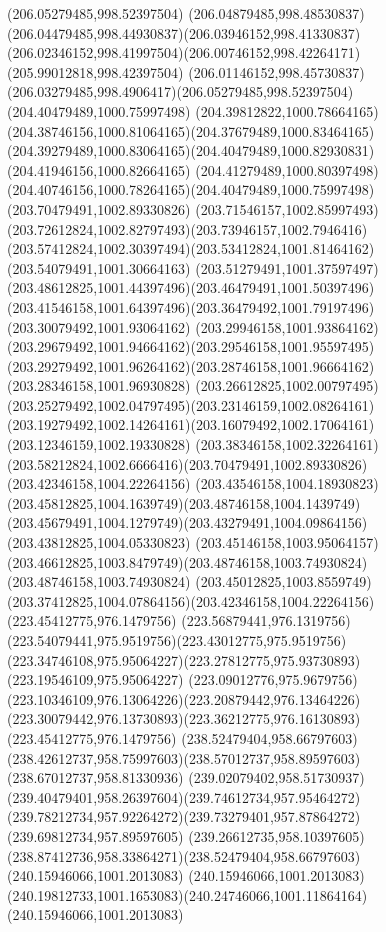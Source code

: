 {{	\moveto(206.05279485,998.52397504)
	\curveto(206.04879485,998.48530837)(206.04479485,998.44930837)(206.03946152,998.41330837)
	\curveto(206.02346152,998.41997504)(206.00746152,998.42264171)(205.99012818,998.42397504)
	\curveto(206.01146152,998.45730837)(206.03279485,998.4906417)(206.05279485,998.52397504)
	\moveto(204.40479489,1000.75997498)
	\curveto(204.39812822,1000.78664165)(204.38746156,1000.81064165)(204.37679489,1000.83464165)
	\curveto(204.39279489,1000.83064165)(204.40479489,1000.82930831)(204.41946156,1000.82664165)
	\curveto(204.41279489,1000.80397498)(204.40746156,1000.78264165)(204.40479489,1000.75997498)
	\moveto(203.70479491,1002.89330826)
	\curveto(203.71546157,1002.85997493)(203.72612824,1002.82797493)(203.73946157,1002.7946416)
	\curveto(203.57412824,1002.30397494)(203.53412824,1001.81464162)(203.54079491,1001.30664163)
	\curveto(203.51279491,1001.37597497)(203.48612825,1001.44397496)(203.46479491,1001.50397496)
	\curveto(203.41546158,1001.64397496)(203.36479492,1001.79197496)(203.30079492,1001.93064162)
	\curveto(203.29946158,1001.93864162)(203.29679492,1001.94664162)(203.29546158,1001.95597495)
	\curveto(203.29279492,1001.96264162)(203.28746158,1001.96664162)(203.28346158,1001.96930828)
	\curveto(203.26612825,1002.00797495)(203.25279492,1002.04797495)(203.23146159,1002.08264161)
	\curveto(203.19279492,1002.14264161)(203.16079492,1002.17064161)(203.12346159,1002.19330828)
	\curveto(203.38346158,1002.32264161)(203.58212824,1002.6666416)(203.70479491,1002.89330826)
	\moveto(203.42346158,1004.22264156)
	\curveto(203.43546158,1004.18930823)(203.45812825,1004.1639749)(203.48746158,1004.1439749)
	\curveto(203.45679491,1004.1279749)(203.43279491,1004.09864156)(203.43812825,1004.05330823)
	\curveto(203.45146158,1003.95064157)(203.46612825,1003.8479749)(203.48746158,1003.74930824)
	\lineto(203.48746158,1003.74930824)
	\curveto(203.45012825,1003.8559749)(203.37412825,1004.07864156)(203.42346158,1004.22264156)
	\moveto(223.45412775,976.1479756)
	\curveto(223.56879441,976.1319756)(223.54079441,975.9519756)(223.43012775,975.9519756)
	\curveto(223.34746108,975.95064227)(223.27812775,975.93730893)(223.19546109,975.95064227)
	\curveto(223.09012776,975.9679756)(223.10346109,976.13064226)(223.20879442,976.13464226)
	\curveto(223.30079442,976.13730893)(223.36212775,976.16130893)(223.45412775,976.1479756)
	\moveto(238.52479404,958.66797603)
	\curveto(238.42612737,958.75997603)(238.57012737,958.89597603)(238.67012737,958.81330936)
	\curveto(239.02079402,958.51730937)(239.40479401,958.26397604)(239.74612734,957.95464272)
	\curveto(239.78212734,957.92264272)(239.73279401,957.87864272)(239.69812734,957.89597605)
	\curveto(239.26612735,958.10397605)(238.87412736,958.33864271)(238.52479404,958.66797603)
	\moveto(240.15946066,1001.2013083)
	\lineto(240.15946066,1001.2013083)
	\curveto(240.19812733,1001.1653083)(240.24746066,1001.11864164)(240.15946066,1001.2013083)
}
}
